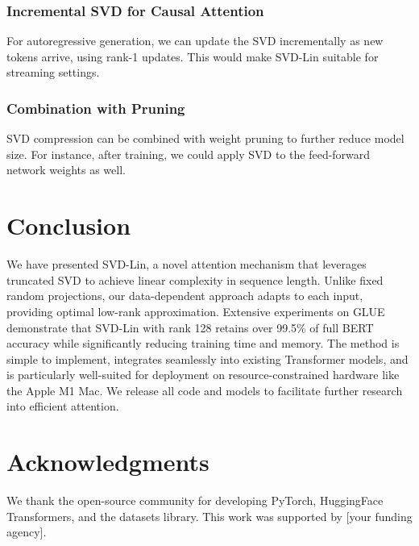 \documentclass[twocolumn]{article}
\begin{document}
\subsubsection{Incremental SVD for Causal Attention}
For autoregressive generation, we can update the SVD incrementally as new tokens arrive, using rank-1 updates. This would make SVD-Lin suitable for streaming settings.

\subsubsection{Combination with Pruning}
SVD compression can be combined with weight pruning to further reduce model size. For instance, after training, we could apply SVD to the feed-forward network weights as well.

\section{Conclusion}
We have presented SVD-Lin, a novel attention mechanism that leverages truncated SVD to achieve linear complexity in sequence length. Unlike fixed random projections, our data-dependent approach adapts to each input, providing optimal low-rank approximation. Extensive experiments on GLUE demonstrate that SVD-Lin with rank 128 retains over 99.5\% of full BERT accuracy while significantly reducing training time and memory. The method is simple to implement, integrates seamlessly into existing Transformer models, and is particularly well-suited for deployment on resource-constrained hardware like the Apple M1 Mac. We release all code and models to facilitate further research into efficient attention.

\section*{Acknowledgments}
We thank the open-source community for developing PyTorch, HuggingFace Transformers, and the datasets library. This work was supported by [your funding agency].
\end{document}
